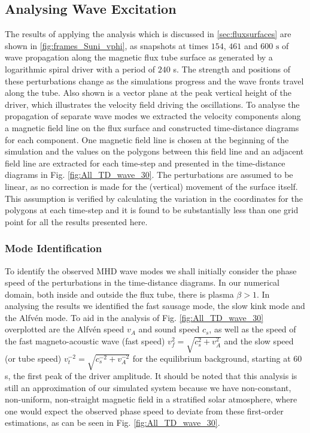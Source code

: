 \subsection{Analysing Wave Excitation}\label{sec:driveranalysis}
The results of applying the analysis which is discussed in \cref{sec:fluxsurfaces} are shown in \cref{fig:frames_Suni_vphi}, as snapshots at times $154$, $461$ and $600 \text{ s}$ of wave propagation along the magnetic flux tube surface as generated by a logarithmic spiral driver with a period of $240$ s.
The strength and positions of these perturbations change as the simulations progress and the wave fronts travel along the tube. 
Also shown is a vector plane at the peak vertical height of the driver, which illustrates the velocity field driving the oscillations.
To analyse the propagation of separate wave modes we extracted the velocity components along a magnetic field line on the flux surface and constructed time-distance diagrams for each component. 
One magnetic field line is chosen at the beginning of the simulation and the values on the polygons between this field line and an adjacent field line are extracted for each time-step and presented in the time-distance diagrams in Fig. \ref{fig:All_TD_wave_30}. 
The perturbations are assumed to be linear, as no correction is made for the (vertical) movement of the surface itself. 
This assumption is verified by calculating the variation in the coordinates for the polygons at each time-step and it is found to be substantially less than one grid point for all the results presented here.


\subsubsection{Mode Identification}
To identify the observed MHD wave modes we shall initially consider the phase speed of the perturbations in the time-distance diagrams. 
In our numerical domain, both inside and outside the flux tube, there is plasma $\beta > 1$.
In analysing the results we identified the fast sausage mode, the slow kink mode and the Alfv\'en mode.
To aid in the analysis of Fig. \ref{fig:All_TD_wave_30} overplotted are the Alfv\'en speed $v_A$ and sound speed $c_s$, as well as the speed of the fast magneto-acoustic wave (fast speed) $v_f^2 = \sqrt{c_s^2 + v_A^2}$ and the slow speed (or tube speed) $v_t^{-2} = \sqrt{c_s^{-2} + v_A^{-2}}$ for the equilibrium background, starting at $60$ s, the first peak of the driver amplitude. 
It should be noted that this analysis is still an approximation of our simulated system because we have non-constant, non-uniform, non-straight magnetic field in a stratified solar atmosphere, where one would expect the observed phase speed to deviate from these first-order estimations, as can be seen in Fig. \ref{fig:All_TD_wave_30}.

